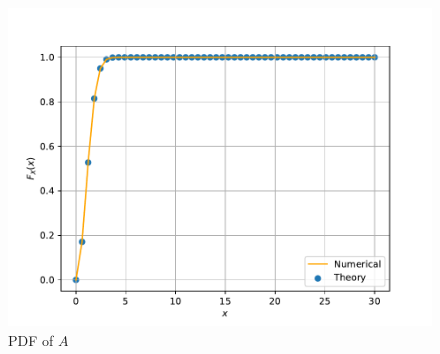 \begin{enumerate}
\begin{figure}[H]
\centering
\includegraphics[width=\columnwidth]{chapter4/figs/rayleigh_cdf.pdf}
\caption{PDF of $A$}
\label{fig:rayleigh_pdf}
\end{figure}
%
\end{enumerate}

